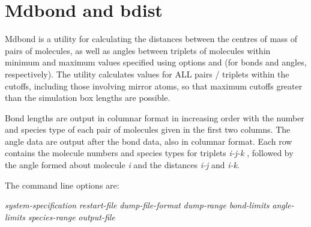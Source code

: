 \documentclass[a4paper,twoside]{report}
\begin{document}
\section{Mdbond and bdist}%

Mdbond is a utility for calculating the distances between the centres
of mass of pairs of molecules, as well as angles between triplets of
molecules within minimum and maximum values specified using options
 and  (for bonds and angles, respectively). The
utility calculates values for ALL pairs / triplets within the cutoffs,
including those involving mirror atoms, so that maximum cutoffs
greater than the simulation box lengths are possible.
        
Bond lengths are output in columnar format in increasing order with
the number and species type of each pair of molecules given in the
first two columns. The angle data are output after the bond data, also
in columnar format. Each row contains the molecule numbers and species
types for triplets \emph{i-j-k} , followed by the angle formed about
molecule \emph{i} and the distances \emph{i-j} and \emph{i-k}.

The command line options are:

\begin{center}
\Lit{[-s} \textit{system-specification}\Lit{]}
\Lit{[-r} \textit{restart-file}\Lit{]}
\Lit{[-d} \textit{dump-file-format}\Lit{]}
\Lit{[-t} \textit{dump-range}\Lit{]} 
\Lit{[-b} \textit{bond-limits}\Lit{]} 
\Lit{[-a} \textit{angle-limits}\Lit{]} 
\Lit{[-g} \textit{species-range}\Lit{]} 
\Lit{[-c]}
\Lit{[-o} \textit{output-file}\Lit{]}
\end{center}
\end{document}
